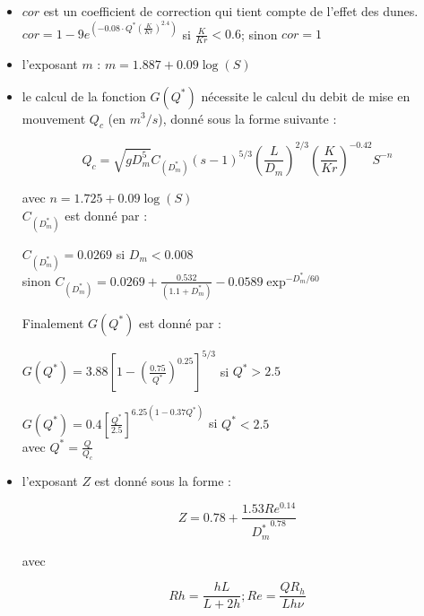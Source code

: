 \documentclass[a4paper,10pt]{article}
\begin{document}
\begin{itemize}
\item $cor$ est un coefficient de correction qui tient compte de l'effet des dunes. \\

$cor = 1 - 9 e^{(-0.08 \cdot Q^* \left(\frac{K}{Kr}\right)^{2.4})}$ si $\frac{K}{Kr} < 0.6$; sinon $cor = 1$ \\

\item l'exposant $m$ : $ m = 1.887 + 0.09 \log(S) $ \\

\item le calcul de la fonction $G(Q^*)$ n\'ecessite le calcul du debit de mise en mouvement $Q_c$ (en $m^3/s$), donn\'e sous la forme suivante :

$$ Q_c = \sqrt{g D_m^5} C_{(D_m^*)} (s-1)^{5/3} \left(\frac{L}{D_m}\right)^{2/3} \left(\frac{K}{Kr}\right)^{-0.42} S^{-n} $$

avec $n = 1.725 + 0.09 \log(S)$ \\

$C_{(D_m^*)}$ est donn\'e par : \\

\begin{center}
$C_{(D_m^*)} = 0.0269$ si $D_m < 0.008$ \\
sinon $C_{(D_m^*)} = 0.0269 + \frac{0.532}{(1.1 + D_m^*)} - 0.0589 \exp^{-D_m^*/60}$ \\ [0.2 cm]
\end{center}

Finalement $G(Q^*)$ est donn\'e par :

$ G(Q^*) = 3.88 \left[ 1 - \left(\frac{0.75}{Q^*}\right)^{0.25} \right]^{5/3} $ si $ Q^* > 2.5 $

$ G(Q^*) = 0.4 \left[\frac{Q^*}{2.5}\right]^{6.25(1-0.37Q^*)} $ si $ Q^* < 2.5 $\\

avec $Q^* = \frac{Q}{Q_c}$ \\

\item l'exposant $Z$ est donn\'e sous la forme :

$$ Z = 0.78 + \frac { 1.53 Re^{0.14} }{ {D_m^*}^{0.78} } $$

avec

$$ Rh = \frac{h L}{L+2h}; Re = \frac{Q R_h}{L h \nu} $$
\end{itemize}

\end{document}
